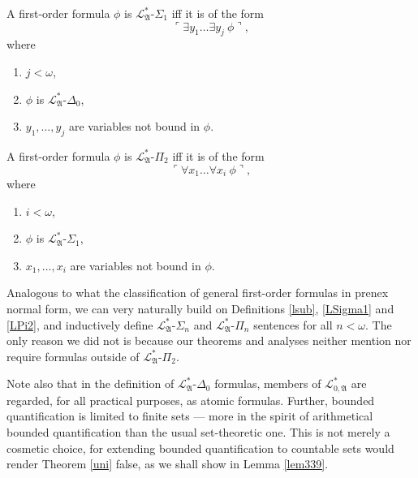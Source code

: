 \documentclass[12pt]{article}
\numberwithin{equation}{section}
\begin{document}
\begin{defi}\label{LSigma1}
A first-order formula $\phi$ is $\mathcal{L}^{*}_{\mathfrak{A}}$-$\Sigma_1$ iff it is of the form $$\ulcorner \exists y_1 \dots \exists y_j \ \phi \urcorner,$$
where 
\begin{enumerate}[label=(\alph*)]
    \item $j < \omega$,
    \item $\phi$ is $\mathcal{L}^{*}_{\mathfrak{A}}$-$\Delta_0$,
    \item $y_1, \dots, y_j$ are variables not bound in $\phi$.
\end{enumerate}
\end{defi}

\begin{defi}\label{LPi2}
A first-order formula $\phi$ is $\mathcal{L}^{*}_{\mathfrak{A}}$-$\Pi_2$ iff it is of the form $$\ulcorner \forall x_1 \dots \forall x_i \ \phi \urcorner,$$
where 
\begin{enumerate}[label=(\alph*)]
    \item $i < \omega$,
    \item $\phi$ is $\mathcal{L}^{*}_{\mathfrak{A}}$-$\Sigma_1$,
    \item $x_1, \dots, x_i$ are variables not bound in $\phi$.
\end{enumerate}
\end{defi}

\begin{rem}\label{snpn}
Analogous to what the classification of general first-order formulas in prenex normal form, we can very naturally build on Definitions \ref{lsub}, \ref{LSigma1} and \ref{LPi2}, and inductively define $\mathcal{L}^{*}_{\mathfrak{A}}$-$\Sigma_n$ and $\mathcal{L}^{*}_{\mathfrak{A}}$-$\Pi_n$ sentences for all $n < \omega$. The only reason we did not is because our theorems and analyses neither mention nor require formulas outside of $\mathcal{L}^{*}_{\mathfrak{A}}$-$\Pi_2$.  
\end{rem}

Note also that in the definition of $\mathcal{L}^{*}_{\mathfrak{A}}$-$\Delta_0$ formulas, members of $\mathcal{L}^{*}_{0, \mathfrak{A}}$ are regarded, for all practical purposes, as atomic formulas. Further, bounded quantification is limited to finite sets --- more in the spirit of arithmetical bounded quantification than the usual set-theoretic one. This is not merely a cosmetic choice, for extending bounded quantification to countable sets would render Theorem \ref{uni} false, as we shall show in Lemma \ref{lem339}.
\end{document}
